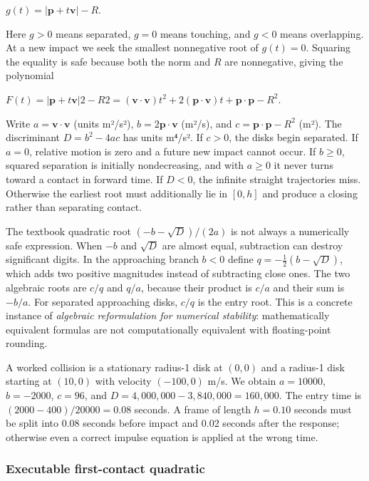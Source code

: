\(g(t)=|\mathbf p+t\mathbf v|-R.\)

Here \(g>0\) means separated, \(g=0\) means touching, and \(g<0\) means overlapping. At a new impact we seek the smallest nonnegative root of \(g(t)=0\). Squaring the equality is safe because both the norm and \(R\) are nonnegative, giving the polynomial

\(F(t)=|\mathbf p+t\mathbf v|2-R2 =(\mathbf v\cdot\mathbf v)t^2 +2(\mathbf p\cdot\mathbf v)t +\mathbf p\cdot\mathbf p-R^2.\)

Write \(a=\mathbf v\cdot\mathbf v\) (units m²/s²), \(b=2\mathbf p\cdot\mathbf v\) (m²/s), and \(c=\mathbf p\cdot\mathbf p-R^2\) (m²). The discriminant \(D=b^2-4ac\) has units m⁴/s². If \(c>0\), the disks begin separated. If \(a=0\), relative motion is zero and a future new impact cannot occur. If \(b\ge0\), squared separation is initially nondecreasing, and with \(a\ge0\) it never turns toward a contact in forward time. If \(D<0\), the infinite straight trajectories miss. Otherwise the earliest root must additionally lie in \([0,h]\) and produce a closing rather than separating contact.

The textbook quadratic root \((-b-\sqrt D)/(2a)\) is not always a numerically safe expression. When \(-b\) and \(\sqrt D\) are almost equal, subtraction can destroy significant digits. In the approaching branch \(b<0\) define \(q=-\tfrac12(b-\sqrt D)\), which adds two positive magnitudes instead of subtracting close ones. The two algebraic roots are \(c/q\) and \(q/a\), because their product is \(c/a\) and their sum is \(-b/a\). For separated approaching disks, \(c/q\) is the entry root. This is a concrete instance of \emph{algebraic reformulation for numerical stability}: mathematically equivalent formulas are not computationally equivalent with floating-point rounding.

A worked collision is a stationary radius-1 disk at \((0,0)\) and a radius-1 disk starting at \((10,0)\) with velocity \((-100,0)\) m/s. We obtain \(a=10000\), \(b=-2000\), \(c=96\), and \(D=4{,}000{,}000-3{,}840{,}000=160{,}000\). The entry time is \((2000-400)/20000=0.08\) seconds. A frame of length \(h=0.10\) seconds must be split into 0.08 seconds before impact and 0.02 seconds after the response; otherwise even a correct impulse equation is applied at the wrong time.

\subsubsection{Executable first-contact quadratic}\label{02-foundations-ii-ch031-executable-first-contact-quadratic}

